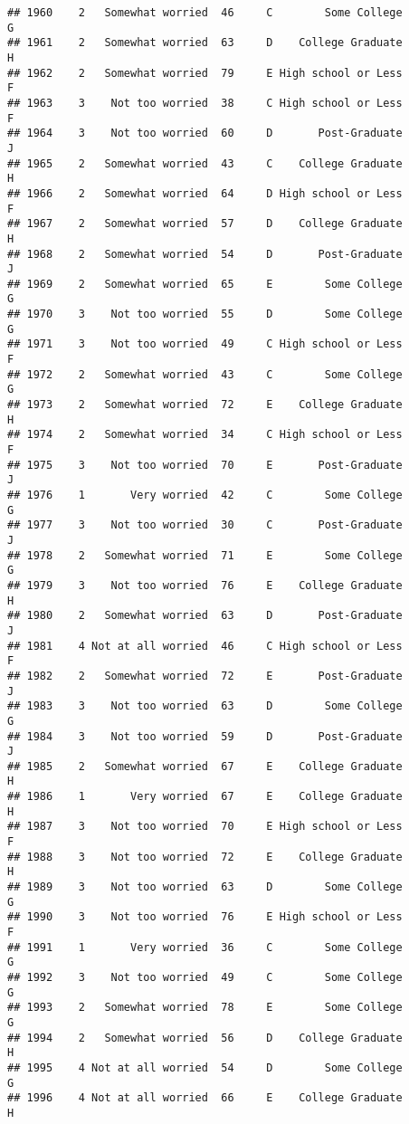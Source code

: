 \documentclass[
]{article}
\begin{document}
\begin{verbatim}
## 1960    2   Somewhat worried  46     C        Some College         G
## 1961    2   Somewhat worried  63     D    College Graduate         H
## 1962    2   Somewhat worried  79     E High school or Less         F
## 1963    3    Not too worried  38     C High school or Less         F
## 1964    3    Not too worried  60     D       Post-Graduate         J
## 1965    2   Somewhat worried  43     C    College Graduate         H
## 1966    2   Somewhat worried  64     D High school or Less         F
## 1967    2   Somewhat worried  57     D    College Graduate         H
## 1968    2   Somewhat worried  54     D       Post-Graduate         J
## 1969    2   Somewhat worried  65     E        Some College         G
## 1970    3    Not too worried  55     D        Some College         G
## 1971    3    Not too worried  49     C High school or Less         F
## 1972    2   Somewhat worried  43     C        Some College         G
## 1973    2   Somewhat worried  72     E    College Graduate         H
## 1974    2   Somewhat worried  34     C High school or Less         F
## 1975    3    Not too worried  70     E       Post-Graduate         J
## 1976    1       Very worried  42     C        Some College         G
## 1977    3    Not too worried  30     C       Post-Graduate         J
## 1978    2   Somewhat worried  71     E        Some College         G
## 1979    3    Not too worried  76     E    College Graduate         H
## 1980    2   Somewhat worried  63     D       Post-Graduate         J
## 1981    4 Not at all worried  46     C High school or Less         F
## 1982    2   Somewhat worried  72     E       Post-Graduate         J
## 1983    3    Not too worried  63     D        Some College         G
## 1984    3    Not too worried  59     D       Post-Graduate         J
## 1985    2   Somewhat worried  67     E    College Graduate         H
## 1986    1       Very worried  67     E    College Graduate         H
## 1987    3    Not too worried  70     E High school or Less         F
## 1988    3    Not too worried  72     E    College Graduate         H
## 1989    3    Not too worried  63     D        Some College         G
## 1990    3    Not too worried  76     E High school or Less         F
## 1991    1       Very worried  36     C        Some College         G
## 1992    3    Not too worried  49     C        Some College         G
## 1993    2   Somewhat worried  78     E        Some College         G
## 1994    2   Somewhat worried  56     D    College Graduate         H
## 1995    4 Not at all worried  54     D        Some College         G
## 1996    4 Not at all worried  66     E    College Graduate         H

\end{verbatim}
\end{document}
